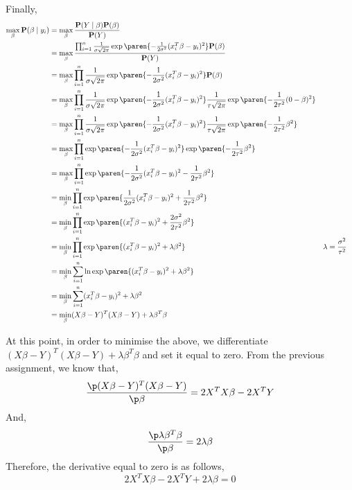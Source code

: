 \documentclass{homework}
\renewcommand\P{\mathbf{P}}
\begin{document}
Finally,
\begin{align*}
  \max_\beta \P(\beta\mid y_i) &= \max_\beta \frac{\P(Y \mid \beta)\P(\beta)}{\P(Y)} \\
        &= \max_\beta \frac{\prod_{i=1}^{n} \frac{1}{\sigma\sqrt{2\pi}}\exp\paren{-\frac{1}{2\sigma^2}(x_{i}^{T}\beta - y_i)^2}\P(\beta)}{\P(Y)} \\
        &= \max_\beta \prod_{i=1}^{n} \frac{1}{\sigma\sqrt{2\pi}}\exp\paren{-\frac{1}{2\sigma^2}(x_{i}^{T}\beta - y_i)^2}\P(\beta) \\
        &= \max_\beta \prod_{i=1}^{n} \frac{1}{\sigma\sqrt{2\pi}}\exp\paren{-\frac{1}{2\sigma^2}(x_{i}^{T}\beta - y_i)^2}\frac{1}{\tau\sqrt{2\pi}}\exp\paren{-\frac{1}{2\tau^2}(0 - \beta)^2} \\
        &= \max_\beta \prod_{i=1}^{n} \frac{1}{\sigma\sqrt{2\pi}}\exp\paren{-\frac{1}{2\sigma^2}(x_{i}^{T}\beta - y_i)^2}\frac{1}{\tau\sqrt{2\pi}}\exp\paren{-\frac{1}{2\tau^2}\beta^2} \\
        &= \max_\beta \prod_{i=1}^{n} \exp\paren{-\frac{1}{2\sigma^2}(x_{i}^{T}\beta - y_i)^2}\exp\paren{-\frac{1}{2\tau^2}\beta^2} \\
        &= \max_\beta \prod_{i=1}^{n} \exp\paren{-\frac{1}{2\sigma^2}(x_{i}^{T}\beta - y_i)^2-\frac{1}{2\tau^2}\beta^2} \\
        &= \min_\beta \prod_{i=1}^{n} \exp\paren{\frac{1}{2\sigma^2}(x_{i}^{T}\beta - y_i)^2+\frac{1}{2\tau^2}\beta^2} \\
        &= \min_\beta \prod_{i=1}^{n} \exp\paren{(x_{i}^{T}\beta - y_i)^2+\frac{2\sigma^2}{2\tau^2}\beta^2} \\
        &= \min_\beta \prod_{i=1}^{n} \exp\paren{(x_{i}^{T}\beta - y_i)^2+\lambda\beta^2} && \lambda = \frac{\sigma^2}{\tau^2} \\
        &= \min_\beta \sum_{i=1}^{n} \ln\exp\paren{(x_{i}^{T}\beta - y_i)^2+\lambda\beta^2} \\
        &= \min_\beta \sum_{i=1}^{n} (x_{i}^{T}\beta - y_i)^2+\lambda\beta^2 \\
        &= \min_\beta (X\beta - Y)^T(X\beta - Y)+\lambda\beta^T\beta \\
\end{align*}

At this point, in order to minimise the above, we differentiate $(X\beta - Y)^T(X\beta - Y)+\lambda\beta^T\beta$ and set it equal to zero. From the previous assignment, we know that,
\[
    \frac{\p (X\beta - Y)^T(X\beta - Y)}{\p \beta} = 2X^TX\beta - 2X^TY
\]
And,
\[
    \frac{\p \lambda\beta^T\beta}{\p\beta} = 2\lambda \beta
\]
Therefore, the derivative equal to zero is as follows,
\[
    2X^TX\beta - 2X^TY + 2\lambda \beta = 0
\]
\end{document}
